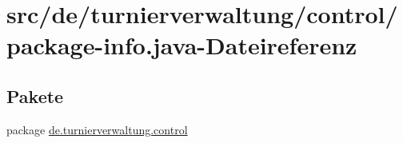 \hypertarget{control_2package-info_8java}{}\section{src/de/turnierverwaltung/control/package-\/info.java-\/\+Dateireferenz}
\label{control_2package-info_8java}
\subsection*{Pakete}
\begin{DoxyCompactItemize}
\item 
package \hyperlink{namespacede_1_1turnierverwaltung_1_1control}{de.\+turnierverwaltung.\+control}
\end{DoxyCompactItemize}
